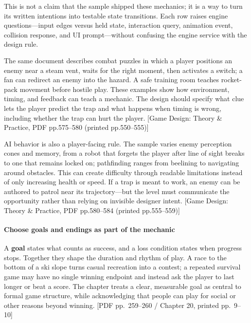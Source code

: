 This is not a claim that the sample shipped these mechanics; it is a way to turn its written intentions into testable state transitions. Each row raises engine questions---input edges versus held state, interaction query, animation event, collision response, and UI prompt---without confusing the engine service with the design rule.

The same document describes combat puzzles in which a player positions an enemy near a steam vent, waits for the right moment, then activates a switch; a fan can redirect an enemy into the hazard. A safe training room teaches rocket-pack movement before hostile play. These examples show how environment, timing, and feedback can teach a mechanic. The design should specify what clue lets the player predict the trap and what happens when timing is wrong, including whether the trap can hurt the player. {[}Game Design: Theory \& Practice, PDF pp.575--580 (printed pp.550--555){]}

AI behavior is also a player-facing rule. The sample varies enemy perception cones and memory, from a robot that forgets the player after line of sight breaks to one that remains locked on; pathfinding ranges from beelining to navigating around obstacles. This can create difficulty through readable limitations instead of only increasing health or speed. If a trap is meant to work, an enemy can be authored to patrol near its trajectory---but the level must communicate the opportunity rather than relying on invisible designer intent. {[}Game Design: Theory \& Practice, PDF pp.580--584 (printed pp.555--559){]}

\paragraph{Choose goals and endings as part of the mechanic}\label{05-engine-i-ch009-choose-goals-and-endings-as-part-of-the-mechanic}

A \textbf{goal} states what counts as success, and a loss condition states when progress stops. Together they shape the duration and rhythm of play. A race to the bottom of a ski slope turns casual recreation into a contest; a repeated survival game may have no single winning endpoint and instead ask the player to last longer or beat a score. The chapter treats a clear, measurable goal as central to formal game structure, while acknowledging that people can play for social or other reasons beyond winning. {[}PDF pp.~259--260 / Chapter 20, printed pp.~9--10{]}

